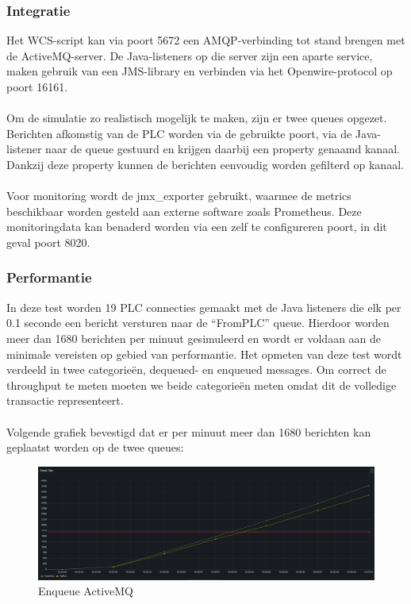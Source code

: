\subsubsection{Integratie}
Het WCS-script kan via poort 5672 een AMQP-verbinding tot stand brengen met de ActiveMQ-server.
De Java-listeners op die server zijn een aparte service, maken gebruik van een JMS-library en verbinden via het Openwire-protocol op poort 16161.
\\\\
Om de simulatie zo realistisch mogelijk te maken, zijn er twee queues opgezet. 
Berichten afkomstig van de PLC worden via de gebruikte poort, via de Java-listener naar de queue gestuurd en krijgen daarbij een property genaamd kanaal.
Dankzij deze property kunnen de berichten eenvoudig worden gefilterd op kanaal. 
\\\\
Voor monitoring wordt de jmx\_exporter gebruikt, waarmee de metrics beschikbaar worden gesteld aan externe software zoals Prometheus. 
Deze monitoringdata kan benaderd worden via een zelf te configureren poort, in dit geval poort 8020.

\subsubsection{Performantie}
In deze test worden 19 PLC connecties gemaakt met de Java listeners die elk per 0.1 seconde een bericht versturen naar de  ``FromPLC'' queue.
Hierdoor worden meer dan 1680 berichten per minuut gesimuleerd en wordt er voldaan aan de minimale vereisten op gebied van performantie.
Het opmeten van deze test wordt verdeeld in twee categorieën, dequeued- en enqueued messages.
Om correct de throughput te meten moeten we beide categorieën meten omdat dit de volledige transactie representeert. 
\\\\
Volgende grafiek bevestigd dat er per minuut meer dan 1680 berichten kan geplaatst worden op de twee queues:
\begin{figure}[h!]
  \centering
  \includegraphics[width=.9\textwidth]{img/amq-enqueue-count.png}
  \caption{\label{fig:amq_enqueue_count}Enqueue ActiveMQ}
\end{figure}

